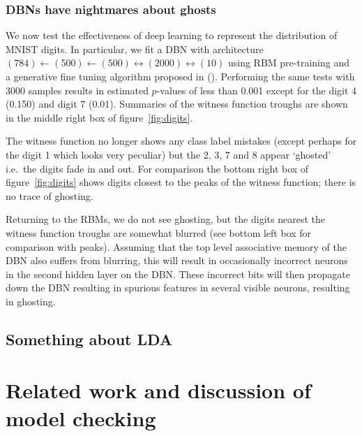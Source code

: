 \documentclass{article} %
\def\ie{i.e.\ }
\begin{document}
\subsubsection{DBNs have nightmares about ghosts}

We now test the effectiveness of deep learning to represent the distribution of MNIST digits.
In particular, we fit a DBN with architecture $(784)\leftarrow(500)\leftarrow(500)\leftrightarrow(2000)\leftrightarrow(10)$ using RBM pre-training and a generative fine tuning algorithm proposed in ().
Performing the same tests with 3000 samples results in estimated $p$-values of less than 0.001 except for the digit 4 (0.150) and digit 7 (0.01).
Summaries of the witness function troughs are shown in the middle right box of figure~\ref{fig:digits}.

The witness function no longer shows any class label mistakes (except perhaps for the digit 1 which looks very peculiar) but the 2, 3, 7 and 8 appear `ghosted' \ie the digits fade in and out.
For comparison the bottom right box of figure~\ref{fig:digits} shows digits closest to the peaks of the witness function; there is no trace of ghosting.

Returning to the RBMs, we do not see ghosting, but the digits nearest the witness function troughs are somewhat blurred (see bottom left box for comparison with peaks).
Assuming that the top level associative memory of the DBN also suffers from blurring, this will result in occasionally incorrect neurons in the second hidden layer on the DBN.
These incorrect bits will then propagate down the DBN resulting in spurious features in several visible neurons, resulting in ghosting.


\subsection{Something about LDA}


\section{Related work and discussion of model checking}

\end{document}

